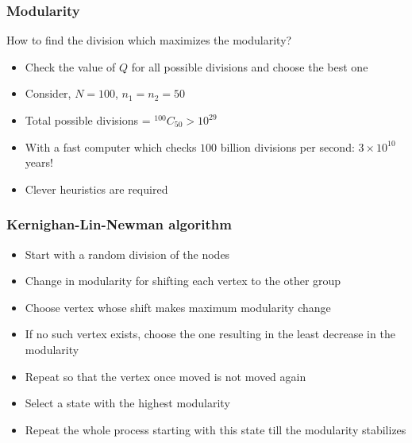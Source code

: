 \documentclass{beamer}
\begin{document}
\begin{frame}
\frametitle{Modularity}
How to find the division which maximizes the modularity?
\pause
\vspace{10pt}
\begin{itemize}
\setlength\itemsep{1em}
\item{Check the value of $Q$ for all possible divisions and choose the best one}
\pause
\item{Consider, $N = 100$, $n_1 = n_2 = 50$}
\pause
\item{Total possible divisions = $^{100}C_{50} > 10^{29}$}
\pause
\item{With a fast computer which checks $100$ billion divisions per second: $3 \times 10^{10}$ years!}
\pause
\item{Clever heuristics are required}
\end{itemize}
\end{frame}
\begin{frame}
    \frametitle{Kernighan-Lin-Newman algorithm}
\pause
    \centering

    \begin{itemize}
        \setlength\itemsep{1em}
        \item{Start with a random division of the nodes}
            \pause
        \item{Change in modularity for shifting each vertex to the other group}
            \pause
        \item{Choose vertex whose shift makes maximum modularity change}
            \pause
        \item{If no such vertex exists, choose the one resulting in the least decrease in the modularity}
            \pause
        \item{Repeat so that the vertex once moved is not moved again}
            \pause
        \item{Select a state with the highest modularity}
            \pause
        \item{Repeat the whole process starting with this state till the modularity stabilizes}
    \end{itemize}
\end{frame}
\end{document}
